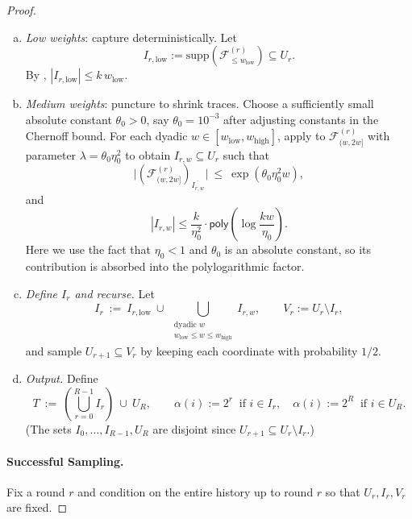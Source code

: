 \documentclass{article}
\DeclareMathOperator{\high}{\mathrm{high}}
\DeclareMathOperator{\low}{\mathrm{low}}
\newcommand{\poly}{\mathsf{poly}}
\newcommand{\<}{\langle}
\renewcommand{\>}{\rangle}
\newcommand{\calF}{\mathcal{F}}
\newcommand{\supp}{\mathrm{supp}}
\begin{document}
\begin{proof}
\smallskip
\begin{enumerate}[(a)]
    \item \emph{Low weights}: capture deterministically. Let
    \[
    I_{r,\mathrm{low}}:=\supp\!\left(\calF^{(r)}_{\le w_{\low}}\right)\subseteq U_r.
    \]
    By , $|I_{r,\mathrm{low}}|\le k\,w_{\low}$.
    \item \emph{Medium weights}: puncture to shrink traces. Choose a sufficiently small absolute constant $\theta_0 > 0$, say $\theta_0 = 10^{-3}$ after adjusting constants in
    the Chernoff bound. 
    For each dyadic $w\in[w_{\low},w_{\high}]$, apply 
    to $\calF^{(r)}_{(w,2w]}$ with parameter $\lambda = \theta_0 \eta_0^2$ to obtain $I_{r,w}\subseteq U_r$
    such that
    \begin{equation}\label{eq:medium_trace_bound_v2}
    \big|\left(\calF^{(r)}_{(w,2w]}\right)_{\overline{I_{r,w}}}\big|
    \ \le\
    \exp (\theta_0 \eta_0^2 w),
    \end{equation}
    and
    \[
    |I_{r, w}| \leq \frac{k}{\eta_0^2} \cdot \poly \left(\log \frac{kw}{\eta_0} \right).
    \]
    Here we use the fact that $\eta_0 < 1$ and $\theta_0$ is an absolute constant, so its contribution is absorbed into the polylogarithmic factor.
    \item \emph{Define $I_r$ and recurse.} Let
    \[
    I_r\ :=\ I_{r,\mathrm{low}} \ \cup\ \bigcup_{\substack{\text{dyadic }w\\ w_{\low}\le w\le w_{\high}}} I_{r,w},
    \qquad
    V_r:=U_r\setminus I_r,
    \]
    and sample $U_{r+1}\subseteq V_r$ by keeping each coordinate with probability $1/2$.
    \item \emph{Output.} Define
    \[
    T\ :=\ \left(\bigcup_{r=0}^{R-1} I_r\right)\ \cup\ U_R,
    \qquad
    \alpha(i):=2^r\ \text{ if } i\in I_r,\quad \alpha(i):=2^R\ \text{ if } i\in U_R.
    \]
    (The sets $I_0,\dots,I_{R-1},U_R$ are disjoint since $U_{r+1}\subseteq U_r\setminus I_r$.)
\end{enumerate}



\paragraph{Successful Sampling.}
Fix a round $r$ and condition on the entire history up to round $r$ so that $U_r,I_r,V_r$ are fixed.


\end{proof}
\end{document}
